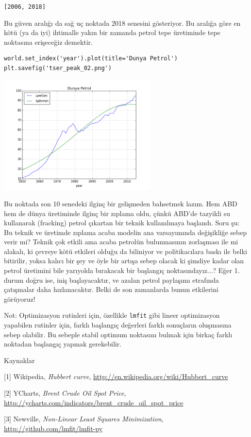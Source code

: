 \documentclass[12pt,fleqn]{article}\usepackage{../../common}
\begin{document}
\begin{verbatim}
[2006, 2018]
\end{verbatim}

Bu güven aralığı da sağ uç noktada 2018 senesini gösteriyor. Bu aralığa
göre en kötü (ya da iyi) ihtimalle yakın bir zamanda petrol tepe üretiminde
tepe noktasına erişeceğiz demektir.

\begin{verbatim}
world.set_index('year').plot(title='Dunya Petrol')
plt.savefig('tser_peak_02.png')
\end{verbatim}

\includegraphics[height=6cm]{tser_peak_02.png}

Bu noktada son 10 senedeki ilginç bir gelişmeden bahsetmek lazım. Hem ABD
hem de dünya üretiminde ilginç bir zıplama oldu, çünkü ABD'de tazyikli su
kullanarak (fracking) petrol çıkartan bir teknik kullanılmaya
başlandı. Soru şu: Bu teknik ve üretimde zıplama acaba modelin ana
varsayımında değişikliğe sebep verir mi? Teknik çok etkili ama acaba
petrolün bulunmasının zorlaşması ile mi alakalı, ki çevreye kötü etkileri
olduğu da biliniyor ve politikacılara baskı ile belki bitirilir, yoksa
kalıcı bir şey ve öyle bir artışa sebep olacak ki şimdiye kadar olan petrol
üretimini bile yarıyolda bırakacak bir başlangıç noktasındayız...?  Eğer
1. durum doğru ise, iniş başlayacaktır, ve azalan petrol paylaşımı
etrafında çatışmalar daha hızlanacaktır. Belki de son zamanlarda bunun
etkilerini görüyoruz!

Not: Optimizasyon rutinleri için, özellikle \verb!lmfit! gibi lineer
optimizasyon yapabilen rutinler için, farklı başlangıç değerleri farklı
sonuçların oluşmasına sebep olabilir. Bu sebeple stabil optimum noktasını
bulmak için birkaç farklı noktadan başlangıç yapmak gerekebilir.

Kaynaklar

[1] Wikipedia, {\em Hubbert curve}, \url{http://en.wikipedia.org/wiki/Hubbert_curve}

[2] YCharts, {\em Brent Crude Oil Spot Price}, \url{http://ycharts.com/indicators/brent_crude_oil_spot_price}

[3] Newville, {\em Non-Linear Least Squares Minimization}, \url{http://github.com/lmfit/lmfit-py}
\end{document}
